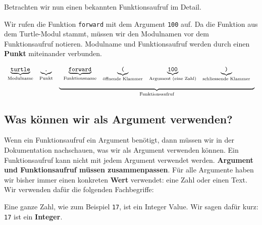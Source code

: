 Betrachten wir nun einen bekannten Funktionsaufruf im Detail.

\begin{example}
    \label{example-function-call}

    Wir rufen die Funktion \lstinline[language={python3}]{forward} mit dem Argument \lstinline[language={python3}]{100} auf. Da die Funktion aus dem Turtle-Modul stammt, müssen wir den Modulnamen vor dem Funktionsaufruf notieren. Modulname und Funktionsaufruf werden durch einen \textbf{Punkt} miteinander verbunden.

    \[
        \begin{array}[t]{ccc}
            \underbrace{\textrm{\texttt{turtle}}}_{\textrm{Modulname}} & \underbrace{\textrm{\texttt{.}}}_{\textrm{Punkt}} &
            \begin{array}[t]{cccc}
                \underbrace{\textrm{\texttt{forward}}}_{\textrm{Funktionsname}} & \underbrace{\textrm{\texttt{(}}}_{\textrm{öffnende Klammer}} & \underbrace{\textrm{\texttt{100}}}_{\textrm{Argument (eine Zahl)}} & \underbrace{\textrm{\texttt{)}}}_{\textrm{schliessende Klammer}}
            \end{array} \\
            & & \underbrace{\hspace{11cm}}_{\textrm{Funktionsaufruf}}
        \end{array}
    \]

\end{example}

\subsection{Was können wir als Argument verwenden?}

Wenn ein Funktionsaufruf ein Argument benötigt, dann müssen wir in der Dokumentation nachschauen, was wir als Argument verwenden können. Ein Funktionsaufruf kann nicht mit jedem Argument verwendet werden. \textbf{Argument und Funktionsaufruf müssen zusammenpassen}. Für alle Argumente haben wir bisher immer einen konkreten \textbf{Wert} verwendet: eine Zahl oder einen Text. Wir verwenden dafür die folgenden Fachbegriffe:

\begin{definition}[Integer]
    Eine ganze Zahl, wie zum Beispiel \lstinline[language={python3}]{17}, ist ein Integer Value. Wir sagen dafür kurz: \lstinline[language={python3}]{17} ist ein \textbf{Integer}.
\end{definition}

